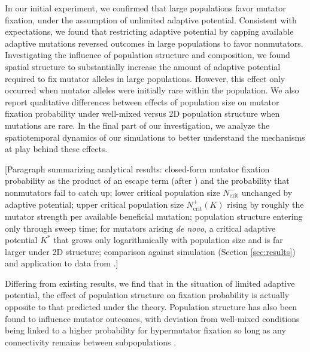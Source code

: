 In our initial experiment, we confirmed that large populations favor mutator fixation, under the assumption of unlimited adaptive potential.
Consistent with expectations, we found that restricting adaptive potential by capping available adaptive mutations reversed outcomes in large populations to favor nonmutators.
Investigating the influence of population structure and composition, we found spatial structure to substantially increase the amount of adaptive potential required to fix mutator alleles in large populations.
However, this effect only occurred when mutator alleles were initially rare within the population.
We also report qualitative differences between effects of population size on mutator fixation probability under well-mixed versus 2D population structure when mutations are rare.
In the final part of our investigation, we analyze the spatiotemporal dynamics of our simulations to better understand the mechanisms at play behind these effects.

[Paragraph summarizing analytical results: closed-form mutator fixation probability as the product of an escape term (after \citet{raynes2018sign}) and the probability that nonmutators fail to catch up; lower critical population size $N_\mathrm{crit}^{-}$ unchanged by adaptive potential; upper critical population size $N_\mathrm{crit}^{+}(K)$ rising by roughly the mutator strength per available beneficial mutation; population structure entering only through sweep time; for mutators arising \textit{de novo}, a critical adaptive potential $K^*$ that grows only logarithmically with population size and is far larger under 2D structure; comparison against simulation (Section \ref{sec:results}) and application to data from \citet{callens2023hypermutator}.]



Differing from existing results, we find that in the situation of limited adaptive potential, the effect of population structure on fixation probability is actually opposite to that predicted under the theory.
Population structure has also been found to influence mutator outcomes, with deviation from well-mixed conditions being linked to a higher probability for hypermutator fixation so long as any connectivity remains between subpopulations \citep{raynes2019migration}.


